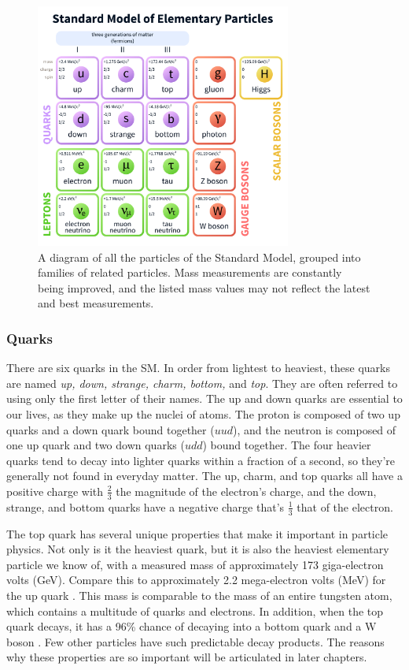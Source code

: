 \begin{figure}[h]
  \centering
  \includegraphics[width=0.75\textwidth]{figures/standard-model-light.pdf}
  \caption%
  {A diagram of all the particles of the Standard Model, grouped into
  families of related particles. Mass measurements are constantly
  being improved, and the listed mass values may not reflect the latest and
  best measurements.}
  \label{fig:standardmodel}
\end{figure}

\subsubsection*{Quarks}
There are six quarks in the SM. In order from lightest to heaviest,
these quarks are named \emph{up, down, strange, charm, bottom,} and
\emph{top}. They are often referred to using only the first letter of
their names. The up and down quarks are essential to our lives, as
they make up the nuclei of atoms. The proton is composed of two up
quarks and a down quark bound together ($uud$), and the neutron is composed of one up
quark and two down quarks ($udd$) bound together. The four heavier
quarks tend to decay into lighter quarks within a fraction of a
second, so they're generally not found in everyday matter. The up,
charm, and top quarks all have a positive charge with $\frac{2}{3}$ the
magnitude of the electron's charge, and the down, strange, and bottom
quarks have a negative charge that's $\frac{1}{3}$ that of the electron.

The top quark has several unique properties that make it important
in particle physics. Not only is
it the heaviest quark, but it is also the heaviest elementary particle
we know of, with a measured mass of approximately 173 giga-electron
volts (GeV). Compare this to approximately 2.2 mega-electron volts
(MeV) for the up quark \cite{pdg}. This mass is comparable to the mass
of an entire tungsten atom, which contains a multitude of quarks and electrons.
In addition, when the top quark decays, it has a 96\% chance of
decaying into a bottom quark and a W boson \cite{pdg}. Few other
particles have such predictable decay products. The reasons why these
properties are so important will be articulated in later chapters. %

